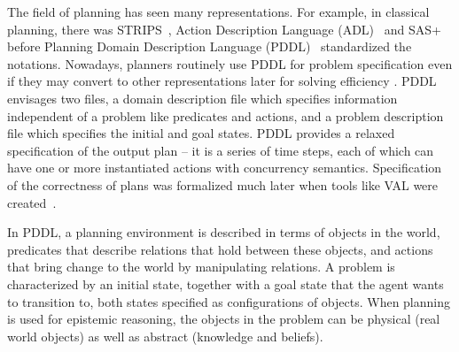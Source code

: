 The field of planning has seen many representations. For example, in classical planning, there was STRIPS~\cite{strips}, Action Description Language (ADL)~\cite{adl} and SAS+~\cite{comparison-pl-backstorm} before Planning Domain Description Language (PDDL)~\cite{pddl,pddl2.1} standardized the notations. Nowadays, planners routinely use PDDL for problem specification even if they may convert to other representations later for solving  efficiency \cite{pddl-conversion-finite}.  PDDL envisages two files, a domain description file which specifies information independent of a problem like predicates and actions, and a problem description file which specifies the initial and goal states. PDDL provides a relaxed specification of the output plan --  it is a series of time steps, each of which can have one or more  instantiated actions with concurrency semantics. Specification of the correctness of plans was formalized much later when tools like VAL were created~\cite{plan-verif-val}.%

In PDDL, a planning  environment is described in terms of objects in  the world, predicates that describe relations that hold between these objects, and actions that bring change to the world by manipulating relations. %
A problem is characterized by an initial state, together with a goal state that the agent wants to transition to, both states specified as configurations of objects.
When planning is used for epistemic reasoning, the objects in the problem can be physical (real world objects) as well as abstract (knowledge and beliefs).



